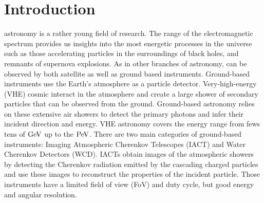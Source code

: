 \documentclass[traditabstract, longauth]{aa}
\begin{document}
\maketitle

\section{Introduction}
\label{sec:introduction}


\gammaray astronomy is a rather young field of research. The \gammaray
range of the electromagnetic spectrum provides us insights into the
most energetic processes in the universe such as those accelerating particles in the surroundings of
black holes, and remnants of supernova explosions. As in other
branches of astronomy, \gammarays can be observed by both
satellite as well as ground based instruments.
Ground-based instruments use the Earth's atmosphere as a particle detector.
Very-high-energy (VHE) cosmic \gammarays interact in the atmosphere and
create a large shower of secondary particles that can be observed from the ground.
Ground-based \gammaray astronomy relies on these extensive air showers to detect the
primary \gammaray photons and infer their incident direction and energy.
VHE \gammaray astronomy covers the energy range from fews tens of ${\rm GeV}$ up to the ${\rm PeV}$.
There are two main categories of ground-based instruments: 
Imaging Atmospheric Cherenkov Telescopes (IACT) and 
Water Cherenkov Detectors (WCD). IACTs obtain images of the atmospheric showers
by detecting the Cherenkov radiation emitted by the cascading charged particles and
use these images to reconstruct the properties of the incident particle.
Those instruments have a limited field of view (FoV) and duty cycle, but
good energy and angular resolution.
\end{document}
